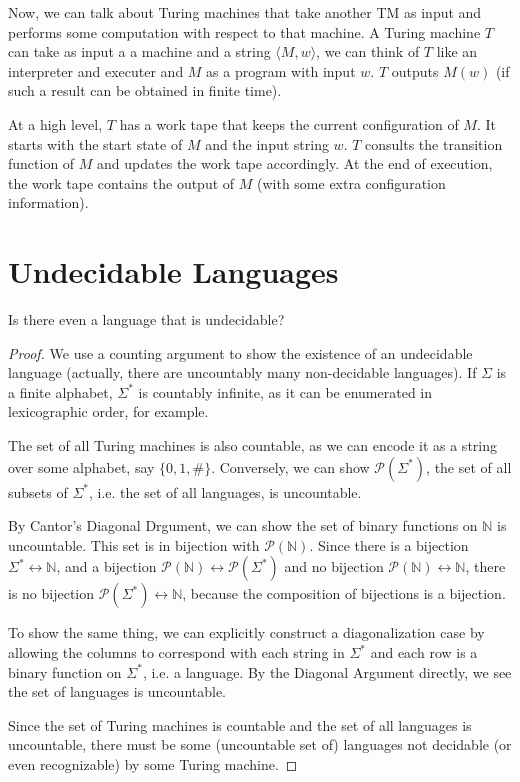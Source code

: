 Now, we can talk about Turing machines that take another TM as input and performs some computation with respect to that machine.  A Turing machine $T$ can take as input a a machine and a string $\langle M,w\rangle$, we can think of $T$ like an interpreter and executer and $M$ as a program with input $w$.  $T$ outputs $M(w)$ (if such a result can be obtained in finite time).

  At a high level, $T$ has a work tape that keeps the current configuration of $M$.  It starts with the start state of $M$ and the input string $w$.  $T$ consults the transition function of $M$ and updates the work tape accordingly.  At the end of execution, the work tape contains the output of $M$ (with some extra configuration information).


\section*{Undecidable Languages}

Is there even a language that is undecidable?


\begin{proof}
	
	We use a counting argument to show the existence of an undecidable language (actually, there are uncountably many non-decidable languages).  If $\Sigma$ is a finite alphabet, $\Sigma^*$ is countably infinite, as it can be enumerated in lexicographic order, for example.  
	
	The set of all Turing machines is also countable, as we can encode it as a string over some alphabet, say $\{0,1,\#\}$.  Conversely, we can show $\mathcal{P}(\Sigma^*)$, the set of all subsets of $\Sigma^*$, i.e. the set of all languages, is uncountable.  
	
	By Cantor's Diagonal Drgument, we can show the set of binary functions on $\mathbb{N}$ is uncountable.  This set is in bijection with $\mathcal{P}(\mathbb{N})$.  Since there is a bijection  $\Sigma^* \longleftrightarrow \mathbb{N}$, and a bijection $\mathcal{P}(\mathbb{N}) \longleftrightarrow \mathcal{P}(\Sigma^*)$ and no  bijection  $\mathcal{P}(\mathbb{N})\longleftrightarrow \mathbb{N}$, there is no bijection $\mathcal{P}(\Sigma^*) \longleftrightarrow \mathbb{N}$, because the composition of bijections is a bijection.
	
	To show the same thing, we can explicitly construct a diagonalization case by allowing the columns to correspond with each string in $\Sigma^*$ and each row is a binary function on $\Sigma^*$, i.e. a language.  By the Diagonal Argument directly, we see the set of languages is uncountable.
	
	Since the set of Turing machines is countable and the set of all languages is uncountable, there must be some (uncountable set of) languages not decidable (or even recognizable) by some Turing machine.
	
	
\end{proof}








